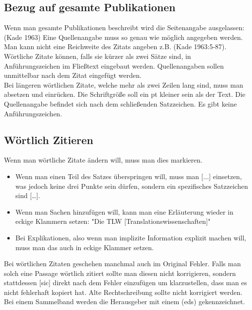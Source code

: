 \documentclass{article}
\begin{document}
	\subsection{Bezug auf gesamte Publikationen}
	Wenn man gesamte Publikationen beschreibt wird die Seitenangabe ausgelassen: (Kade 1963) Eine Quellenangabe muss so genau wie möglich angegeben werden. Man kann nicht eine Reichweite des Zitats angeben z.B. (Kade 1963:5-87).\\
	Wörtliche Zitate können, falls sie kürzer als zwei Sätze sind, in Anführungszeichen im Fließtext eingebaut werden. Quellenangaben sollen unmittelbar nach dem Zitat eingefügt werden. \\
	Bei längeren wörtlichen Zitate, welche mehr als zwei Zeilen lang sind, muss man absetzen und einrücken. Die Schriftgröße soll ein pt kleiner sein als der Text. Die Quellenangabe befindet sich nach dem schließenden Satzzeichen. Es gibt keine Anführungszeichen. \\
	\subsection{Wörtlich Zitieren}
	Wenn man wörtliche Zitate ändern will, muss man dies markieren. 
	\begin{itemize}
		\item{Wenn man einen Teil des Satzes überspringen will, muss man [...] einsetzen, was jedoch keine drei Punkte sein dürfen, sondern ein spezifisches Satzzeichen sind [\dots].}
		\item{Wenn man Sachen hinzufügen will, kann man eine Erläuterung wieder in eckige Klammern setzen: "Die TLW [Translationswissenschaften]"}
		\item{Bei Explikationen, also wenn man implizite Information explizit machen will, muss man das auch in eckige Klammer setzen.}
	\end{itemize}

	Bei wörtlichen Zitaten geschehen manchmal auch im Original Fehler. Falls man solch eine Passage wörtlich zitiert sollte man diesen nicht korrigieren, sondern stattdessen [sic] direkt nach dem Fehler einzufügen um klarzustellen, dass man es nicht fehlerhaft kopiert hat. Alte Rechtschreibung sollte nicht korrigiert werden. \\


	Bei einem Sammelband werden die Herausgeber mit einem (eds) gekennzeichnet.
	
	

	
\end{document}
